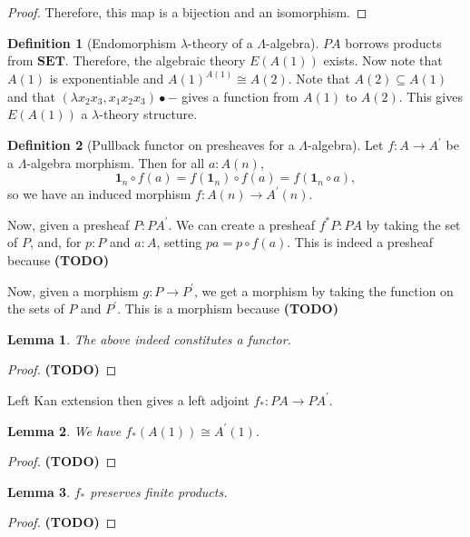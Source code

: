\documentclass[a4paper]{amsbook}
\newtheorem{lemma}{Lemma}
\theoremstyle{definition}
\newtheorem{definition}{Definition}
\theoremstyle{remark}
\newcommand\SET{\mathbf{SET}}
\newcommand\TODO{\textbf{(TODO)} }
\begin{document}
\begin{proof}
    Therefore, this map is a bijection and an isomorphism.
  \end{proof}

  \begin{definition}[Endomorphism $ \lambda $-theory of a $ \Lambda $-algebra]
    $ PA $ borrows products from $ \SET $. Therefore, the algebraic theory $ E(A(1)) $ exists. Now note that $ A(1) $ is exponentiable and $ A(1)^{A(1)} \cong A(2) $.
    Note that $ A(2) \subseteq A(1) $ and that $ (\lambda x_2 x_3, x_1 x_2 x_3) \bullet - $ gives a function from $ A(1) $ to $ A(2) $. This gives $ E(A(1)) $ a $ \lambda $-theory structure.
  \end{definition}

  \begin{definition}[Pullback functor on presheaves for a $ \Lambda $-algebra]
    Let $ f: A \to A^\prime $ be a $ \Lambda $-algebra morphism. Then for all $ a: A(n) $,
    \[ \mathbf 1_n \circ f(a) = f(\mathbf 1_n) \circ f(a) = f(\mathbf 1_n \circ a), \]
    so we have an induced morphism $ f: A(n) \to A^\prime(n) $.

    Now, given a presheaf $ P: PA^\prime $. We can create a presheaf $ f^* P : PA $ by taking the set of $ P $, and, for $ p: P $ and $ a: A $, setting $ pa = p \circ f(a) $. This is indeed a presheaf because \TODO

    Now, given a morphism $ g: P \to P^\prime $, we get a morphism by taking the function on the sets of $ P $ and $ P^\prime $. This is a morphism because \TODO
  \end{definition}

  \begin{lemma}
    The above indeed constitutes a functor.
  \end{lemma}
  \begin{proof}
    \TODO
  \end{proof}

  Left Kan extension then gives a left adjoint $ f_*: PA \to PA^\prime $.

  \begin{lemma}
    We have $ f_*(A(1)) \cong A^\prime(1) $.
  \end{lemma}
  \begin{proof}
    \TODO
  \end{proof}

  \begin{lemma}
    $ f_* $ preserves finite products.
  \end{lemma}
  \begin{proof}
    \TODO
  \end{proof}
\end{document}
